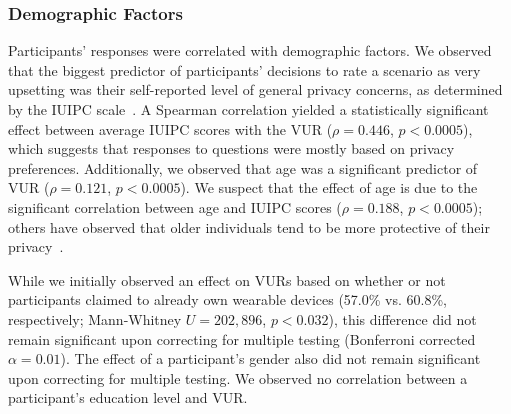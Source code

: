 \subsubsection{Demographic Factors}

Participants' responses were correlated with demographic factors. We observed that the biggest predictor of participants' decisions to rate a scenario as very upsetting was their self-reported level of general privacy concerns, as determined by the IUIPC scale~\cite{malhotra2004internet}. A Spearman correlation yielded a statistically significant effect between average IUIPC scores with the VUR ($\rho=0.446$, $p<0.0005$), which suggests that responses to questions were mostly based on privacy preferences. Additionally, we observed that age was a significant predictor of VUR ($\rho=0.121$, $p<0.0005$). We suspect that the effect of age is due to the significant correlation between age and IUIPC scores ($\rho=0.188$, $p<0.0005$); others have observed that older individuals tend to be more protective of their privacy~\cite{varian2005demographics}.

While we initially observed an effect on VURs based on whether or not participants claimed to already own wearable devices (57.0\% vs. 60.8\%, respectively; Mann-Whitney $U=202,896$, $p<0.032$), this difference did not remain significant upon correcting for multiple testing (Bonferroni corrected $\alpha=0.01$). The effect of a participant's gender also did not remain significant upon correcting for multiple testing. We observed no correlation between a participant's education level and VUR.